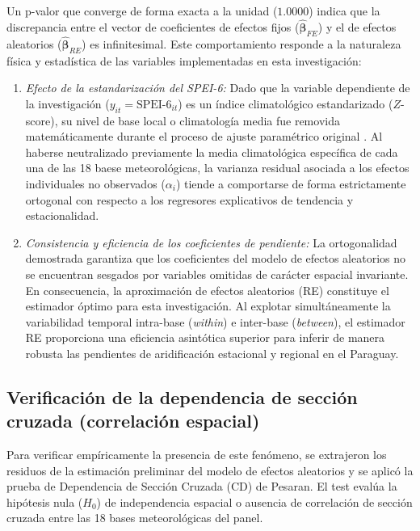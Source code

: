 Un p-valor que converge de forma exacta a la unidad ($1.0000$) indica que la discrepancia entre el vector de coeficientes de efectos fijos ($\boldsymbol{\hat{\beta}}_{FE}$) y el de efectos aleatorios ($\boldsymbol{\hat{\beta}}_{RE}$) es infinitesimal. Este comportamiento responde a la naturaleza física y estadística de las variables implementadas en esta investigación:

\begin{enumerate}
    \item \textit{Efecto de la estandarización del SPEI-6:} Dado que la variable dependiente de la investigación ($y_{it} = \text{SPEI-6}_{it}$) es un índice climatológico estandarizado ($Z$-score), su nivel de base local o climatología media fue removida matemáticamente durante el proceso de ajuste paramétrico original \cite{vicenteserrano2010}. Al haberse neutralizado previamente la media climatológica específica de cada una de las 18 baese meteorológicas, la varianza residual asociada a los efectos individuales no observados ($\alpha_i$) tiende a comportarse de forma estrictamente ortogonal con respecto a los regresores explicativos de tendencia y estacionalidad.
    \item \textit{Consistencia y eficiencia de los coeficientes de pendiente:} La ortogonalidad demostrada garantiza que los coeficientes del modelo de efectos aleatorios no se encuentran sesgados por variables omitidas de carácter espacial invariante. En consecuencia, la aproximación de efectos aleatorios (RE) constituye el estimador óptimo para esta investigación. Al explotar simultáneamente la variabilidad temporal intra-base (\textit{within}) e inter-base (\textit{between}), el estimador RE proporciona una eficiencia asintótica superior para inferir de manera robusta las pendientes de aridificación estacional y regional en el Paraguay.
\end{enumerate}

\subsection{Verificación de la dependencia de sección cruzada (correlación espacial)}

Para verificar empíricamente la presencia de este fenómeno, se extrajeron los residuos de la estimación preliminar del modelo de efectos aleatorios y se aplicó la prueba de Dependencia de Sección Cruzada (CD) de Pesaran. El test evalúa la hipótesis nula ($H_0$) de independencia espacial o ausencia de correlación de sección cruzada entre las 18 bases meteorológicas del panel. 

